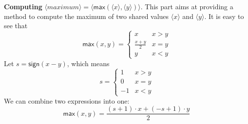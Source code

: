 \documentclass[letterpaper]{article} %
\begin{document}
    \textbf{Computing} $ \langle maximum\rangle  = \langle \mathsf{max}(\langle x\rangle,\langle y\rangle)\rangle $.
       This part aims at providing a method to compute the maximum of two shared values $\langle x \rangle$ and $\langle y \rangle$.
       It is easy to see that
       $$\mathsf{max}(x,y) = \left\{\begin{matrix}
           x & x>y\\
           \frac{x+ y}{2} & x=y\\
           y & x<y
           \end{matrix}\right.$$
       Let $s = \mathsf{sign}(x-y)$, which means
       $$s = \left\{\begin{matrix}
           1 & x>y\\
           0 & x=y\\
           -1 & x<y
           \end{matrix}\right.$$
       We can combine two expressions into one:
       $$\mathsf{max}(x,y) = \frac{(s+1)\cdot x+ (-s+1)\cdot y}{2}$$
\end{document}
